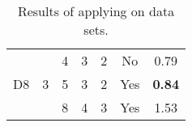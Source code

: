 \begin{table}[t]
\begin{minipage}{0.48\linewidth}
\begin{tabular}[t]{|c|c|c|c|c|c|c|}
         &   & 4  & 3 & 2 & No &  0.79 \\\cline{3-7}
    D8   & 3 & 5  & 3 & 2 & Yes & {\bf 0.84}  \\\cline{3-7}
         &   & 8  & 4 & 3 & Yes  & 1.53   \\\hline
  \end{tabular}
    
  \end{minipage}
  \caption{Results of applying \ourtool on data sets.
  }
  \label{tab:results}
\end{table}
